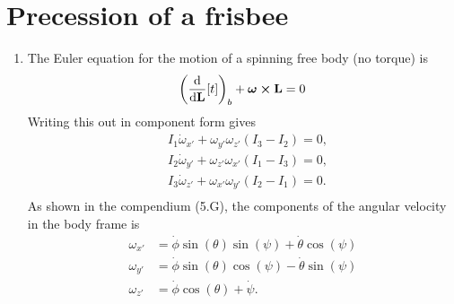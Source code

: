 \documentclass{article}
\begin{document}
    \section{Precession of a frisbee}

    \begin{enumerate}[label=(\alph*)]
    \item The Euler equation for the motion of a spinning free body (no torque) is 
        \begin{equation*}
            \left(\dv{\mathbf{L}}[t]\right)_b + \boldsymbol \omega \cross \mathbf{L} = 0
        \end{equation*}
        Writing this out in component form gives
        \begin{align*}
            & I_1 \dot \omega_{x'} + \omega_{y'}\omega_{z'}(I_3 - I_2) = 0, \\
            & I_2 \dot \omega_{y'} + \omega_{z'}\omega_{x'}(I_1 - I_3) = 0, \\
            & I_3 \dot \omega_{z'} + \omega_{x'}\omega_{y'}(I_2 - I_1) = 0 .\\
        \end{align*}
        As shown in the compendium (5.G), the components of the angular velocity in the body frame is 
        \begin{align*}
            \omega_{x'} & = \dot \phi \sin(\theta) \sin(\psi) + \dot\theta \cos(\psi) \\
            \omega_{y'} & = \dot \phi \sin(\theta)\cos(\psi) - \dot \theta  \sin(\psi)\\
            \omega_{z'} & = \dot \phi \cos(\theta) + \dot \psi.
        \end{align*}


\end{enumerate}
\end{document}
